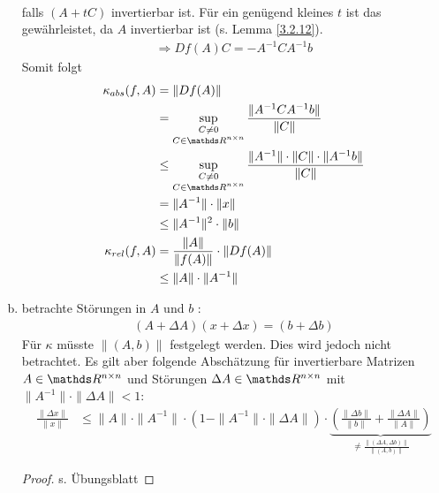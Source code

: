 \begin{Bspe}
\begin{enumerate}[a)]
\begin{align*}
    \end{align*}
    falls $(A+tC)$ invertierbar ist. Für ein genügend kleines $t$ ist das gewährleistet, da $A$ invertierbar ist (s. Lemma \ref{3.2.12}).
    \begin{gather*}
      \Rightarrow Df(A) C = -A^{-1}CA^{-1}b
    \end{gather*}
    Somit folgt
    \begin{align}
      \nonumber
      \kappa_{abs} (f,A) &= \|Df(A)\| \\ \nonumber
                         &= \sup_{\substack{
                           C\neq 0 \\ 
      C\in \R^{n\times n}											  	
      }}
      \frac{\|A^{-1}CA^{-1}b\|}{\|C\|} \\ \nonumber
                         &\leq \sup_{\substack{
                           C\neq 0 \\ 
      C \in \R^{n\times n}														  	
      }}
      \frac{\|A^{-1}\|\cdot\|C\|\cdot\|A^{-1}b\|}{\|C\|} \\ \nonumber
                         &= \|A^{-1}\| \cdot\|x\| \\ \nonumber
                         &\leq   \|A^{-1}\|^2 \cdot\|b\| \\ \nonumber
      \kappa_{rel}(f,A)  &= \frac{\|A\|}{\|f(A)\|} \cdot \|Df(A)\| \\
                         &\leq \|A\|\cdot \|A^{-1}\| \label{III.2.10}
    \end{align}
  \item betrachte Störungen in $A$ und $b$ :
    \begin{gather*}
      (A+\Delta A)(x+\Delta x) = (b+\Delta b) 
    \end{gather*}
    Für $\kappa$ müsste $\|(A,b)\|$ festgelegt werden. Dies wird jedoch nicht betrachtet. Es gilt aber folgende Abschätzung für invertierbare Matrizen $A\in \Renn $ und Störungen
    $\Delta A \in \R^{n\times n}$ mit $\|A^{-1}\|\cdot \|\Delta A\| < 1$:
    \begin{align}
      \frac{\|\Delta x\|}{\|x\|} & \leq \|A\| \cdot \|A^{-1}\|\cdot (1- \|A^{-1}\|\cdot \|\Delta A\|) 
                                   \cdot
                                   \underbrace{\left(  \frac{\|\Delta b\|}{\|b\|} +  \frac{\|\Delta A\|}{\|A\|}  \right)}_{\neq  \frac{\|(\Delta A, \Delta b)\|}{\|(A,b)\|} }
                                   \label{III.2.11}
    \end{align}
    \begin{proof} s. Übungsblatt \end{proof}
  \end{enumerate}
\end{Bspe}

